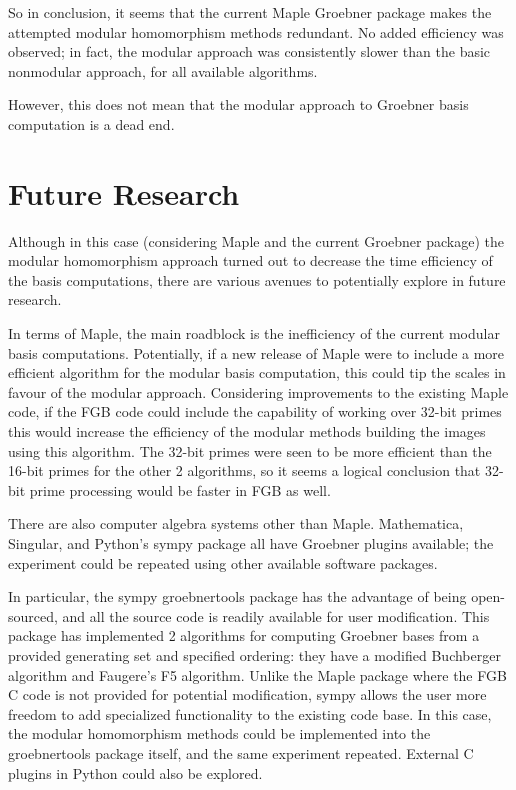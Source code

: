\documentclass[letterpaper,12pt,titlepage,oneside,final]{book}
\begin{document}
So in conclusion, it seems that the current Maple Groebner package makes the attempted modular homomorphism methods redundant.  No added efficiency was observed; in fact, the modular approach was consistently slower than the basic nonmodular approach, for all available algorithms.  

However, this does not mean that the modular approach to Groebner basis computation is a dead end. 

\section{Future Research}    

Although in this case (considering Maple and the current Groebner package) the modular homomorphism approach turned out to decrease the time efficiency of the basis computations, there are various avenues to potentially explore in future research.  

In terms of Maple, the main roadblock is the inefficiency of the current modular basis computations.  Potentially, if a new release of Maple were to include a more efficient algorithm for the modular basis computation, this could tip the scales in favour of the modular approach.  Considering improvements to the existing Maple code, if the FGB code could include the capability of working over 32-bit primes this would increase the efficiency of the modular methods building the images using this algorithm.  The 32-bit primes were seen to be more efficient than the 16-bit primes for the other 2 algorithms, so it seems a logical conclusion that 32-bit prime processing would be faster in FGB as well.  

There are also computer algebra systems other than Maple.  Mathematica, Singular, and Python's sympy package all have Groebner plugins available; the experiment could be repeated using other available software packages.  

In particular, the sympy groebnertools package has the advantage of being open-sourced, and all the source code is readily available for user modification.  This package has implemented 2 algorithms for computing Groebner bases from a provided generating set and specified ordering: they have a modified Buchberger algorithm and Faugere's F5 algorithm.  Unlike the Maple package where the FGB C code is not provided for potential modification, sympy allows the user more freedom to add specialized functionality to the existing code base.  In this case, the modular homomorphism methods could be implemented into the groebnertools package itself, and the same experiment repeated.  External C plugins in Python could also be explored.
\end{document}
